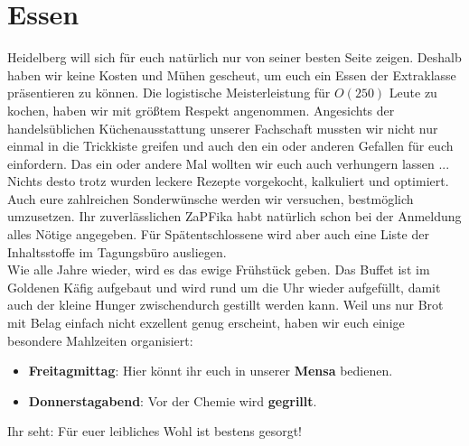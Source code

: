 \section{Essen}
  Heidelberg will sich für euch natürlich nur von seiner besten Seite zeigen. Deshalb haben wir keine Kosten und Mühen gescheut,
  um euch ein Essen der Extraklasse präsentieren zu können.
  Die logistische Meisterleistung für $O(250)$ Leute zu kochen, haben wir mit größtem Respekt angenommen.
  Angesichts der handelsüblichen Küchenausstattung unserer Fachschaft mussten wir nicht nur einmal in
  die Trickkiste greifen und auch den ein oder anderen Gefallen für euch einfordern. Das ein oder andere Mal wollten
  wir euch auch verhungern lassen ... \\
  Nichts desto trotz wurden leckere Rezepte vorgekocht, kalkuliert und optimiert.
  Auch eure zahlreichen Sonderwünsche werden wir versuchen, bestmöglich umzusetzen.
  Ihr zuverlässlichen ZaPFika habt natürlich schon bei der Anmeldung alles Nötige angegeben.
  Für Spätentschlossene wird aber auch eine Liste der Inhaltsstoffe im Tagungsbüro ausliegen. \\

  Wie alle Jahre wieder, wird es das ewige Frühstück geben. Das Buffet ist im Goldenen
  Käfig aufgebaut und wird rund um die Uhr wieder aufgefüllt, damit auch der kleine
  Hunger zwischendurch gestillt werden kann.
  Weil uns nur Brot mit Belag einfach nicht exzellent genug erscheint, haben wir euch einige besondere Mahlzeiten organisiert:
  \begin{itemize}
    \item \textbf{Freitagmittag}: Hier könnt ihr euch in unserer \textbf{Mensa} bedienen.
    \item \textbf{Donnerstagabend}: Vor der Chemie wird \textbf{gegrillt}.
  \end{itemize}
  Ihr seht: Für euer leibliches Wohl ist bestens gesorgt!
